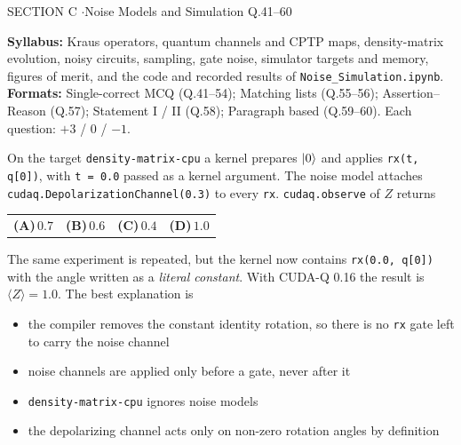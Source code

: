 \documentclass[11pt,a4paper]{article}
\newcommand{\optlabel}[1]{\textbf{(#1)}}
\newenvironment{qitem}[1]{\begin{list}{}{\setlength{\leftmargin}{3.3em}\setlength{\labelwidth}{3.1em}%
  \setlength{\labelsep}{0.2em}\setlength{\topsep}{3pt}\setlength{\parsep}{3pt}}\item[\textbf{Q.#1}\hfill]}{\end{list}}
\newcommand{\qsep}{\par\vspace{2pt}{\color{black!15}\hrule}\vspace{4pt}}
\begin{document}
\newpage

\begin{sectionbanner}SECTION C \enspace$\cdot$\enspace Noise Models and Simulation \hfill Q.41--60\end{sectionbanner}

{\small \textbf{Syllabus:} Kraus operators, quantum channels and CPTP maps, density-matrix evolution, noisy circuits, sampling, gate noise, simulator targets and memory, figures of merit, and the code and recorded results of \texttt{Noise\_Simulation.ipynb}.\\ \textbf{Formats:} Single-correct MCQ (Q.41--54); Matching lists (Q.55--56); Assertion--Reason (Q.57); Statement I / II (Q.58); Paragraph based (Q.59--60). Each question: $+3$ / $0$ / $-1$.}
\par\medskip

\begin{qitem}{41}
On the target \texttt{density-matrix-cpu} a kernel prepares $\ket0$ and applies \texttt{rx(t, q[0])}, with \texttt{t = 0.0} passed as a kernel
argument. The noise model attaches \texttt{cudaq.DepolarizationChannel(0.3)} to every \texttt{rx}. \texttt{cudaq.observe} of $Z$ returns
\par\smallskip\noindent\begin{tabularx}{\linewidth}{@{}*{4}{L}@{}}
\optlabel{A}\,$0.7$ & \optlabel{B}\,$0.6$ & \optlabel{C}\,$0.4$ & \optlabel{D}\,$1.0$
\end{tabularx}
\end{qitem}
\qsep

\begin{qitem}{42}
The same experiment is repeated, but the kernel now contains \texttt{rx(0.0, q[0])} with the angle written as a \emph{literal constant}. With CUDA-Q 0.16
the result is $\langle Z\rangle = 1.0$. The best explanation is
\begin{itemize}[leftmargin=2.6em, labelsep=0.4em, itemsep=2pt, topsep=3pt]
\item[\optlabel{A}] the compiler removes the constant identity rotation, so there is no \texttt{rx} gate left to carry the noise channel
\item[\optlabel{B}] noise channels are applied only before a gate, never after it
\item[\optlabel{C}] \texttt{density-matrix-cpu} ignores noise models
\item[\optlabel{D}] the depolarizing channel acts only on non-zero rotation angles by definition
\end{itemize}
\end{qitem}
\qsep
\end{document}
